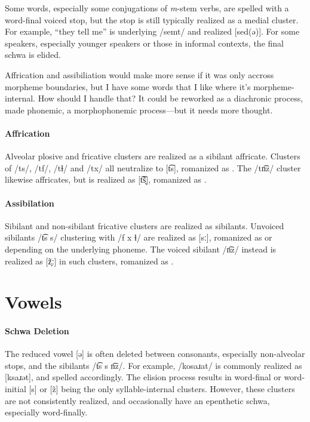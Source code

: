 Some words, especially some conjugations of \emph{m}-stem verbs, are spelled with a word-final voiced stop, but the stop is still typically realized as a medial cluster. For example,  “they tell me” is underlying /semt/ and realized [sed(ə)]. For some speakers, especially younger speakers or those in informal contexts, the final schwa is elided.

\begin{kaobox}[frametitle=\sc todo:]
Affrication and assibiliation would make more sense if it was only accross morpheme boundaries, but I have some words that I like where it's morpheme-internal. How should I handle that? It could be reworked as a diachronic process, made phonemic, a morphophonemic process---but it needs more thought.
\end{kaobox}

\paragraph{Affrication}
Alveolar plosive and fricative clusters are realized as a sibilant affricate. Clusters of /ts/, /tf/, /tɬ/ and /tx/ all neutralize to [t͡s], romanized as . The /tn͡z/ cluster likewise affricates, but is realized as [t͡s̞̃], romanized as . 

\paragraph{Assibilation}
Sibilant and non-sibilant fricative clusters are realized as sibilants. Unvoiced sibilants /t͡s s/ clustering with /f x ɬ/ are realized as [sː], romanized as  or  depending on the underlying phoneme. The voiced sibilant /n͡z/ instead is realized as [z̞̃ː] in such clusters, romanized as .

\section{Vowels}
\paragraph{Schwa Deletion}
The reduced vowel [ə] is often deleted between consonants, especially non-alveolar stops, and the sibilants /t͡s s n͡z/. For example,  /kosaɹat/ is commonly realized as [ksaɹət], and spelled accordingly. The elision process results in word-final or word-initial [s] or [z̃] being the only syllable-internal clusters. However, these clusters are not consistently realized, and occasionally have an epenthetic schwa, especially word-finally. 

